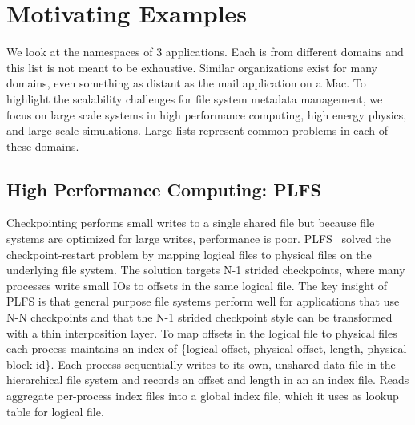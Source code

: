 \section{Motivating Examples}
\label{sec:motivating-examples}

We look at the namespaces of 3 applications.  Each is from different domains
and this list is not meant to be exhaustive. Similar organizations exist for
many domains, even something as distant as the mail application on a Mac. To
highlight the scalability challenges for file system metadata management, we
focus on large scale systems in high performance computing, high energy
physics, and large scale simulations. Large lists represent common problems in
each of these domains.


\subsection{High Performance Computing: PLFS}
\label{sec:plfs}

Checkpointing performs small writes to a single shared file but because file
systems are optimized for large writes, performance is poor.
PLFS~\cite{bent_plfs_2009} solved the checkpoint-restart problem by mapping
logical files to physical files on the underlying file system. The solution
targets N-1 strided checkpoints, where many processes write small IOs to
offsets in the same logical file. The key insight of PLFS is that general
purpose file systems perform well for applications that use N-N checkpoints and
that the N-1 strided checkpoint style can be transformed with a thin
interposition layer. To map offsets in the logical file to physical files each
process maintains an index of \{logical offset, physical offset, length,
physical block id\}.  Each process sequentially writes to its own, unshared
data file in the hierarchical file system and records an offset and length in
an an index file. Reads aggregate per-process index files into a global index
file, which it uses as lookup table for logical file. 

